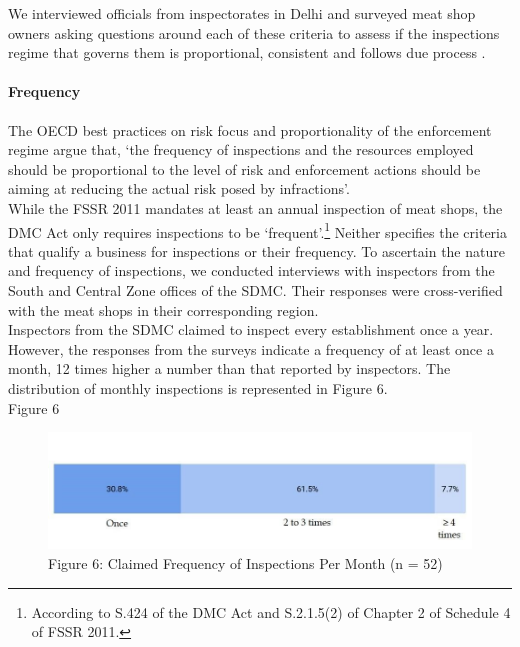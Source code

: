 \documentclass[a4paper, 12pt]{article}
\begin{document}
We interviewed officials from inspectorates in Delhi and surveyed meat shop owners asking questions around each of these criteria to assess if the inspections regime that governs them is proportional, consistent and follows due process \parencite{oecd1report}. \\ 

\paragraph{Frequency}
The OECD best practices on risk focus and proportionality of the enforcement regime argue that, ‘the frequency of inspections and the resources employed should be proportional to the level of risk and enforcement actions should be aiming at reducing the actual risk posed by infractions’. \\

While the FSSR 2011 mandates at least an annual inspection of meat shops, the DMC Act only requires inspections to be ‘frequent’.\footnote{According to S.424 of the DMC Act and S.2.1.5(2) of Chapter 2 of Schedule 4 of FSSR 2011.} Neither specifies the criteria that qualify a business for inspections or their frequency. To ascertain the nature and frequency of inspections, we conducted interviews with inspectors from the South and Central Zone offices of the SDMC. Their responses were cross-verified with the meat shops in their corresponding region. \\

Inspectors from the SDMC claimed to inspect every establishment once a year. However, the responses from the surveys indicate a frequency of at least once a month, 12 times higher a number than that reported by inspectors. The distribution of monthly inspections is represented in Figure 6. \\

Figure 6
\begin{figure}[H]
\centering
\includegraphics{Fig 6.jpg}
\caption[Optional Caption]{Figure 6: Claimed Frequency of Inspections Per Month (n = 52)}
\end{figure} 
\end{document}
